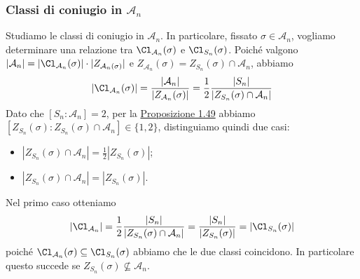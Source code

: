 \documentclass[11pt]{scrartcl}
\begin{document}
\subsubsection{Classi di coniugio in $\mathcal{A}_n$}

Studiamo le classi di coniugio in $\mathcal{A}_n$. In particolare,
fissato $\sigma \in \mathcal{A}_n$, vogliamo determinare una relazione tra
$\Cl_{\mathcal{A}_n}(\sigma)$ e $\Cl_{S_n}(\sigma)$.
Poiché valgono $|\mathcal{A}_n| = |\Cl_{\mathcal{A}_n}(\sigma)|\cdot |Z_{\mathcal{A}_n(\sigma)}|$
e $Z_{\mathcal{A}_n}(\sigma) = Z_{S_n}(\sigma) \cap \mathcal{A}_n$, abbiamo
\[
    |\Cl_{\mathcal{A}_n}(\sigma)| = \frac{|\mathcal{A}_n|}{|Z_{\mathcal{A}_n}(\sigma)|} =
    \frac 1 2 \frac{|S_n|}{|Z_{S_n}(\sigma) \cap \mathcal{A}_n|}
\]
Dato che $[S_n:\mathcal{A}_n] = 2$, per la \hyperref[prop2.0]{Proposizione 1.49}
abbiamo $[Z_{S_n}(\sigma):Z_{S_n}(\sigma) \cap \mathcal{A}_n] \in \{1, 2\}$,
distinguiamo quindi due casi:
\begin{itemize}
    \item $|Z_{S_n}(\sigma) \cap \mathcal{A}_n| = \displaystyle\frac 1 2 |Z_{S_n}(\sigma)|$;
    \item $|Z_{S_n}(\sigma) \cap \mathcal{A}_n| = |Z_{S_n}(\sigma)|$.
\end{itemize}

Nel primo caso otteniamo 
\[
    |\Cl_{\mathcal{A}_n}| = \frac 1 2 \frac{|S_n|}{|Z_{S_n}(\sigma) \cap \mathcal{A}_n|} =
    \frac{|S_n|}{|Z_{S_n}(\sigma)|} = |\Cl_{S_n}(\sigma)|
\]
poiché $\Cl_{\mathcal{A}_n}(\sigma)\subseteq \Cl_{S_n}(\sigma)$ abbiamo che le
due classi coincidono. In particolare questo succede se $Z_{S_n}(\sigma)
\nsubseteq \mathcal{A}_n$.
\end{document}
